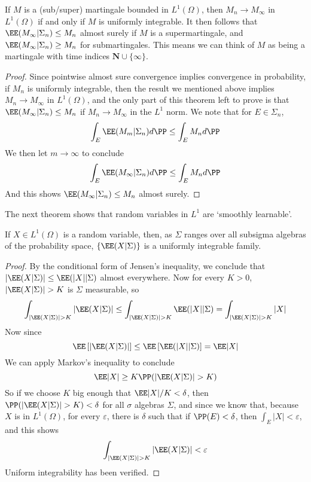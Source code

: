 \begin{corollary}
    If $M$ is a (sub/super) martingale bounded in $L^1(\Omega)$, then $M_n \to M_\infty$ in $L^1(\Omega)$ if and only if $M$ is uniformly integrable. It then follows that $\EE(M_\infty|\Sigma_n) \leq M_n$ almost surely if $M$ is a supermartingale, and $\EE(M_\infty|\Sigma_n) \geq M_n$ for submartingales. This means we can think of $M$ as being a martingale with time indices $\mathbf{N} \cup \{ \infty \}$.
\end{corollary}
\begin{proof}
    Since pointwise almost sure convergence implies convergence in probability, if $M_n$ is uniformly integrable, then the result we mentioned above implies $M_n \to M_\infty$ in $L^1(\Omega)$, and the only part of this theorem left to prove is that $\EE(M_\infty|\Sigma_n) \leq M_n$ if $M_n \to M_\infty$ in the $L^1$ norm. We note that for $E \in \Sigma_n$,
    \[ \int_E \EE(M_m|\Sigma_n) d\PP \leq \int_E M_n d\PP  \]
    We then let $m \to \infty$ to conclude
    \[ \int_E \EE(M_\infty|\Sigma_n) d\PP \leq \int_E M_n d\PP \]
    And this shows $\EE(M_\infty|\Sigma_n) \leq M_n$ almost surely.
\end{proof}

The next theorem shows that random variables in $L^1$ are `smoothly learnable'.

\begin{lemma}
    If $X \in L^1(\Omega)$ is a random variable, then, as $\Sigma$ ranges over all subsigma algebras of the probability space, $\{ \EE(X|\Sigma)  \}$ is a uniformly integrable family.
\end{lemma}
\begin{proof}
    By the conditional form of Jensen's inequality, we conclude that $|\EE(X|\Sigma)| \leq \EE(|X| | \Sigma)$ almost everywhere. Now for every $K > 0$, $|\EE(X|\Sigma)| > K$ is $\Sigma$ measurable, so
    \[ \int_{|\EE(X|\Sigma)| > K} |\EE(X|\Sigma)| \leq \int_{|\EE(X | \Sigma)| > K} \EE(|X| | \Sigma) = \int_{|\EE(X|\Sigma)| > K} |X|  \]
    Now since
    \[ \EE \left[ |\EE(X|\Sigma)| \right] \leq \EE \left[ \EE(|X| | \Sigma) \right] = \EE |X| \]
    We can apply Markov's inequality to conclude
    \[ \EE |X| \geq K \PP(|\EE(X|\Sigma)| > K) \]
    So if we choose $K$ big enough that $\EE |X|/K < \delta$, then $\PP(|\EE(X|\Sigma)| > K) < \delta$ for all $\sigma$ algebras $\Sigma$, and since we know that, because $X$ is in $L^1(\Omega)$, for every $\varepsilon$, there is $\delta$ such that if $\PP(E) < \delta$, then $\int_E |X| < \varepsilon$, and this shows
    \[ \int_{|\EE(X|\Sigma)| > K} |\EE(X|\Sigma)| < \varepsilon \]
    Uniform integrability has been verified.
\end{proof}

